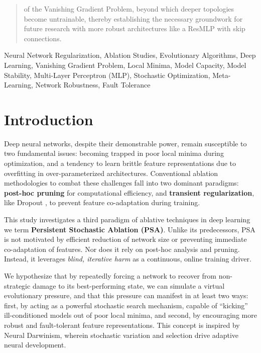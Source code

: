 \documentclass[conference]{IEEEtran}
\begin{document}
\begin{abstract}
of the Vanishing Gradient Problem, beyond which deeper topologies become untrainable, thereby establishing the necessary groundwork for future research with more robust architectures like a ResMLP with skip connections.
\end{abstract}

\begin{IEEEkeywords}
Neural Network Regularization, Ablation Studies, Evolutionary Algorithms, Deep Learning, Vanishing Gradient Problem, Local Minima, Model Capacity, Model Stability, Multi-Layer Perceptron (MLP), Stochastic Optimization, Meta-Learning, Network Robustness, Fault Tolerance
\end{IEEEkeywords}



\section{Introduction}

Deep neural networks, despite their demonstrable power, remain susceptible to two fundamental issues: becoming trapped in poor local minima during optimization, and a tendency to learn brittle feature representations due to overfitting in over-parameterized architectures. Conventional ablation methodologies to combat these challenges fall into two dominant paradigms: \textbf{post-hoc pruning} \cite{b1, b2} for computational efficiency, and \textbf{transient regularization}, like Dropout \cite{b3}, to prevent feature co-adaptation during training.

This study investigates a third paradigm of ablative techniques in deep learning we term \textbf{Persistent Stochastic Ablation (PSA)}. Unlike its predecessors, PSA is not motivated by efficient reduction of network size or preventing immediate co-adaptation of features. Nor does it rely on post-hoc analysis and pruning. Instead, it leverages \textit{blind, iterative harm} as a continuous, online training driver. 

We hypothesize that by repeatedly forcing a network to recover from non-strategic damage to its best-performing state, we can simulate a virtual evolutionary pressure, and that this pressure can manifest in at least two ways: first, by acting as a powerful stochastic search mechanism, capable of ``kicking'' ill-conditioned models out of poor local minima, and second, by encouraging more robust and fault-tolerant feature representations. This concept is inspired by Neural Darwinism\cite{b4}, wherein stochastic variation and selection drive adaptive neural development.
\end{document}
